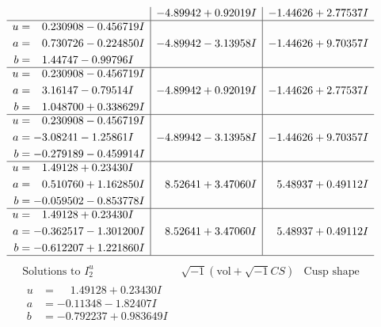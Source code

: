 \documentclass[1p]{elsarticle_modified}
\theoremstyle{definition}
\newcommand{\I}{\sqrt{-1}}
\begin{document}
$$\begin{array}{c|c|c}
 & -4.89942 + 0.92019 I & -1.44626 + 2.77537 I \\ \hline\begin{aligned}
u &= \phantom{-}0.230908 - 0.456719 I \\
a &= \phantom{-}0.730726 - 0.224850 I \\
b &= \phantom{-}1.44747 - 0.99796 I\end{aligned}
 & -4.89942 - 3.13958 I & -1.44626 + 9.70357 I \\ \hline\begin{aligned}
u &= \phantom{-}0.230908 - 0.456719 I \\
a &= \phantom{-}3.16147 - 0.79514 I \\
b &= \phantom{-}1.048700 + 0.338629 I\end{aligned}
 & -4.89942 + 0.92019 I & -1.44626 + 2.77537 I \\ \hline\begin{aligned}
u &= \phantom{-}0.230908 - 0.456719 I \\
a &= -3.08241 - 1.25861 I \\
b &= -0.279189 - 0.459914 I\end{aligned}
 & -4.89942 - 3.13958 I & -1.44626 + 9.70357 I \\ \hline\begin{aligned}
u &= \phantom{-}1.49128 + 0.23430 I \\
a &= \phantom{-}0.510760 + 1.162850 I \\
b &= -0.059502 - 0.853778 I\end{aligned}
 & \phantom{-}8.52641 + 3.47060 I & \phantom{-}5.48937 + 0.49112 I \\ \hline\begin{aligned}
u &= \phantom{-}1.49128 + 0.23430 I \\
a &= -0.362517 - 1.301200 I \\
b &= -0.612207 + 1.221860 I\end{aligned}
 & \phantom{-}8.52641 + 3.47060 I & \phantom{-}5.48937 + 0.49112 I\\
 \hline 
 \end{array}$$\newpage$$\begin{array}{c|c|c}  
\text{Solutions to }I^u_{2}& \I (\text{vol} + \sqrt{-1}CS) & \text{Cusp shape}\\
 \hline 
\begin{aligned}
u &= \phantom{-}1.49128 + 0.23430 I \\
a &= -0.11348 - 1.82407 I \\
b &= -0.792237 + 0.983649 I\end{aligned}

\end{array}$$
\end{document}
